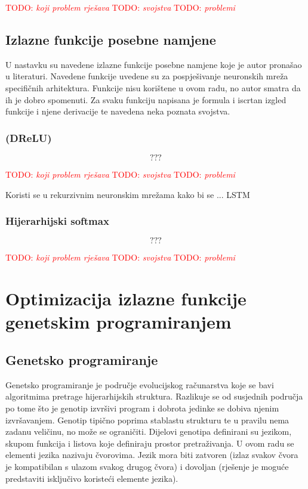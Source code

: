 \documentclass[times, utf8, numeric, diplomski]{fer}
\def\TODO#1{\noindent\textcolor{red}{TODO: \textit{#1}}\newline}
\def\todo#1{\TODO{#1}}
\def\todoimg#1{\begin{center} \textcolor{red}{\big[ IMAGE: \textit{#1} \big]} \end{center}}
\begin{document}
\todo{koji problem rješava}
\todo{svojstva}
\todo{problemi}

\section{Izlazne funkcije posebne namjene}
U nastavku su navedene izlazne funkcije posebne namjene koje je autor pronašao u literaturi. Navedene funkcije uvedene su za pospješivanje neuronskih mreža specifičnih arhitektura. Funkcije nisu korištene u ovom radu, no autor smatra da ih je dobro spomenuti. Za svaku funkciju napisana je formula i iscrtan izgled funkcije i njene derivacije te navedena neka poznata svojstva.

\subsection{(DReLU)}

\todoimg{}

\begin{equation}
???
\end{equation}

\todo{koji problem rješava}
\todo{svojstva}
\todo{problemi}

Koristi se u rekurzivnim neuronskim mrežama kako bi se ... LSTM

\subsection{Hijerarhijski softmax}

\todoimg{}

\begin{equation}
???
\end{equation}

\todo{koji problem rješava}
\todo{svojstva}
\todo{problemi}
\fi %

\chapter{Optimizacija izlazne funkcije genetskim programiranjem}

\section{Genetsko programiranje}
Genetsko programiranje je područje evolucijskog računarstva koje se bavi algoritmima pretrage hijerarhijskih struktura. Razlikuje se od susjednih područja po tome što je genotip izvršivi program i dobrota jedinke se dobiva njenim izvršavanjem. Genotip tipično poprima stablastu strukturu te u pravilu nema zadanu veličinu, no može se ograničiti. Dijelovi genotipa definirani su jezikom, skupom funkcija i listova koje definiraju prostor pretraživanja. U ovom radu se elementi jezika nazivaju čvorovima. Jezik mora biti zatvoren (izlaz svakov čvora je kompatibilan s ulazom svakog drugog čvora) i dovoljan (rješenje je moguće predstaviti isključivo koristeći elemente jezika). \citep{comp_intelligence}
\end{document}
